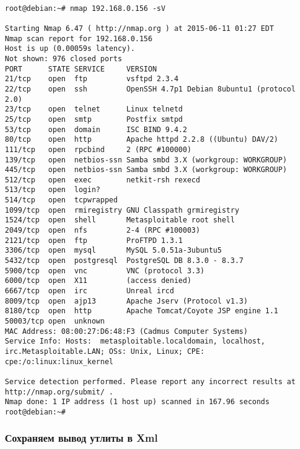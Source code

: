 \documentclass[10pt,a4paper]{article}
\begin{document}
\begin{verbatim}

root@debian:~# nmap 192.168.0.156 -sV

Starting Nmap 6.47 ( http://nmap.org ) at 2015-06-11 01:27 EDT
Nmap scan report for 192.168.0.156
Host is up (0.00059s latency).
Not shown: 976 closed ports
PORT      STATE SERVICE     VERSION
21/tcp    open  ftp         vsftpd 2.3.4
22/tcp    open  ssh         OpenSSH 4.7p1 Debian 8ubuntu1 (protocol 2.0)
23/tcp    open  telnet      Linux telnetd
25/tcp    open  smtp        Postfix smtpd
53/tcp    open  domain      ISC BIND 9.4.2
80/tcp    open  http        Apache httpd 2.2.8 ((Ubuntu) DAV/2)
111/tcp   open  rpcbind     2 (RPC #100000)
139/tcp   open  netbios-ssn Samba smbd 3.X (workgroup: WORKGROUP)
445/tcp   open  netbios-ssn Samba smbd 3.X (workgroup: WORKGROUP)
512/tcp   open  exec        netkit-rsh rexecd
513/tcp   open  login?
514/tcp   open  tcpwrapped
1099/tcp  open  rmiregistry GNU Classpath grmiregistry
1524/tcp  open  shell       Metasploitable root shell
2049/tcp  open  nfs         2-4 (RPC #100003)
2121/tcp  open  ftp         ProFTPD 1.3.1
3306/tcp  open  mysql       MySQL 5.0.51a-3ubuntu5
5432/tcp  open  postgresql  PostgreSQL DB 8.3.0 - 8.3.7
5900/tcp  open  vnc         VNC (protocol 3.3)
6000/tcp  open  X11         (access denied)
6667/tcp  open  irc         Unreal ircd
8009/tcp  open  ajp13       Apache Jserv (Protocol v1.3)
8180/tcp  open  http        Apache Tomcat/Coyote JSP engine 1.1
50003/tcp open  unknown
MAC Address: 08:00:27:D6:48:F3 (Cadmus Computer Systems)
Service Info: Hosts:  metasploitable.localdomain, localhost, irc.Metasploitable.LAN; OSs: Unix, Linux; CPE: cpe:/o:linux:linux_kernel

Service detection performed. Please report any incorrect results at http://nmap.org/submit/ .
Nmap done: 1 IP address (1 host up) scanned in 167.96 seconds
root@debian:~# 

\end{verbatim}

\subsubsection{Сохраняем вывод утлиты в Xml}
\end{document}
